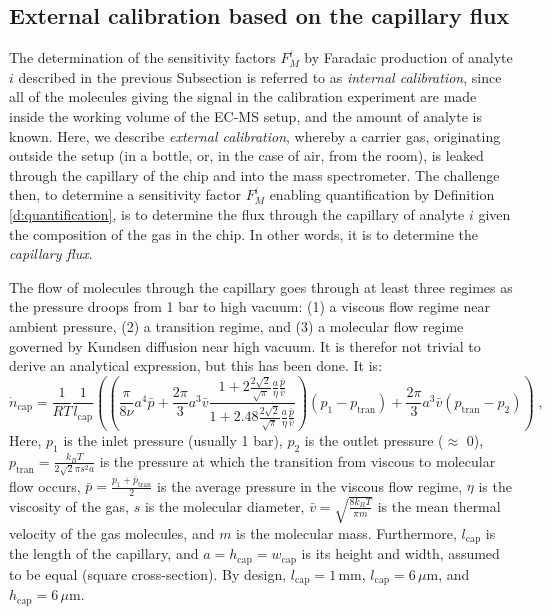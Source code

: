 \subsection{External calibration based on the capillary flux}\label{subsec:capillary}

The determination of the sensitivity factors $F_M^i$ by Faradaic production of analyte $i$ described in the previous Subsection is referred to as \textit{internal calibration}, since all of the molecules giving the signal in the calibration experiment are made inside the working volume of the EC-MS setup, and the amount of analyte is known. Here, we describe \textit{external calibration}, whereby a carrier gas, originating outside the setup (in a bottle, or, in the case of air, from the room), is leaked through the capillary of the chip and into the mass spectrometer. The challenge then, to determine a sensitivity factor $F_M^i$ enabling quantification by Definition \ref{d:quantification}, is to determine the flux through the capillary of analyte $i$ given the composition of the gas in the chip. In other words, it is to determine the \textit{capillary flux}. 

The flow of molecules through the capillary goes through at least three regimes as the pressure droops from 1 bar to high vacuum\cite{Henriksen2009}: (1) a viscous flow regime near ambient pressure, (2) a transition regime, and (3) a molecular flow regime governed by Kundsen diffusion near high vacuum. It is therefor not trivial to derive an analytical expression, but this has been done. It is\cite{Trimarco2017_PhD}:
\begin{equation}
\dot{n}_{\mathrm{cap}} = \frac{1}{R T}\frac{1}{l_\text{cap}} 
\left(\left( 
\frac{\pi}{8\nu}a^4\bar{p} + \frac{2\pi}{3}a^3\bar{v} \frac {1+2\frac{2\sqrt{2}}{\sqrt{\pi}}\frac{a}{\eta}\frac{\bar{p}}{\bar{v}}} {1+2.48\frac{2\sqrt{2}}{\sqrt{\pi}}\frac{a}{\eta}\frac{\bar{p}}{\bar{v}}}
\right)
\left(p_1-p_{\mathrm{tran}}\right) 
+ 
\frac{2\pi}{3}a^3\bar{v}\left(p_{\mathrm{tran}}-p_2\right)\right) 
\;, \label{eq:capillary}
\end{equation}
Here, $p_1$ is the inlet pressure (usually 1 bar), $p_2$ is the outlet pressure ($\approx$ 0), $p_{\mathrm{tran}}=\frac{k_B T}{2 \sqrt{2}\pi s^2 a}$ is the pressure at which the transition from viscous to molecular flow occurs, $\bar{p}=\frac{p_1 + \bar{p}_{\mathrm{tran}}}{2}$ is the average pressure in the viscous flow regime, $\eta$ is the viscosity of the gas, $s$ is the molecular diameter, $\bar{v}=\sqrt{\frac{8 k_B T}{\pi m}}$ is the mean thermal velocity of the gas molecules, and $m$ is the molecular mass. Furthermore, $l_\text{cap}$ is the length of the capillary, and $a=h_\text{cap}=w_\text{cap}$ is its height and width, assumed to be equal (square cross-section). By design, $l_\text{cap} = 1\,\text{mm}$, $l_\text{cap} = 6\,\mu\text{m}$, and $h_\text{cap} = 6\,\mu\text{m}$.

